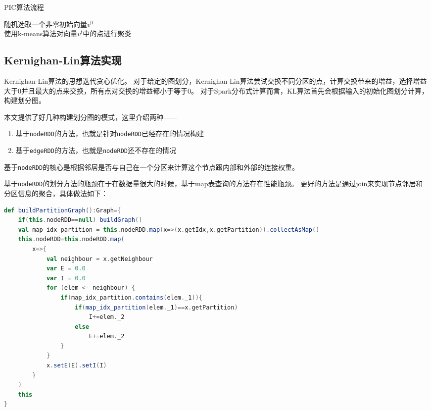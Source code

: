 \begin{algorithm}[htbp]
\caption{PIC算法流程}
\SetAlgoLined
{}
随机选取一个非零初始向量$v^0$ \\
使用k-means算法对向量$v^t$中的点进行聚类
\end{algorithm}

\subsection{Kernighan-Lin算法实现}

Kernighan-Lin算法的思想迭代贪心优化。
对于给定的图划分，Kernighan-Lin算法尝试交换不同分区的点，计算交换带来的增益，选择增益大于$0$并且最大的点来交换，所有点对交换的增益都小于等于$0$。
对于Spark分布式计算而言，KL算法首先会根据输入的初始化图划分计算，构建划分图。

本文提供了好几种构建划分图的模式，这里介绍两种——
\begin{enumerate}
    \item 基于\texttt{nodeRDD}的方法，也就是针对\texttt{nodeRDD}已经存在的情况构建
    \item 基于\texttt{edgeRDD}的方法，也就是\texttt{nodeRDD}还不存在的情况
\end{enumerate}

基于\texttt{nodeRDD}的核心是根据邻居是否与自己在一个分区来计算这个节点跟内部和外部的连接权重。

基于\texttt{nodeRDD}的划分方法的瓶颈在于在数据量很大的时候，基于map表查询的方法存在性能瓶颈。
更好的方法是通过join来实现节点邻居和分区信息的聚合，具体做法如下：

\begin{lstlisting}[language=Scala]
def buildPartitionGraph():Graph={
    if(this.nodeRDD==null) buildGraph()
    val map_idx_partition = this.nodeRDD.map(x=>(x.getIdx,x.getPartition)).collectAsMap()
    this.nodeRDD=this.nodeRDD.map(
        x=>{
            val neighbour = x.getNeighbour
            var E = 0.0
            var I = 0.0
            for (elem <- neighbour) {
                if(map_idx_partition.contains(elem._1)){
                    if(map_idx_partition(elem._1)==x.getPartition)
                        I+=elem._2
                    else
                        E+=elem._2
                }
            }
            x.setE(E).setI(I)
        }
    )
    this
}
\end{lstlisting}

